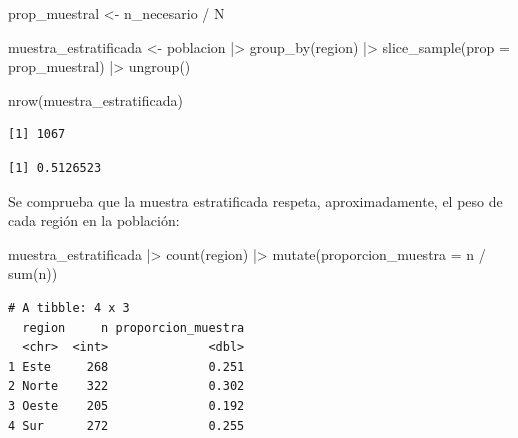 \documentclass[
  spanish,
  a4paper,
]{scrreport}
\newenvironment{Shaded}{\begin{snugshade}}{\end{snugshade}}
\newcommand{\AttributeTok}[1]{\textcolor[rgb]{0.40,0.45,0.13}{#1}}
\newcommand{\FunctionTok}[1]{\textcolor[rgb]{0.28,0.35,0.67}{#1}}
\newcommand{\NormalTok}[1]{\textcolor[rgb]{0.00,0.23,0.31}{#1}}
\newcommand{\OtherTok}[1]{\textcolor[rgb]{0.00,0.23,0.31}{#1}}
\newcommand{\SpecialCharTok}[1]{\textcolor[rgb]{0.37,0.37,0.37}{#1}}
\newcommand{\StringTok}[1]{\textcolor[rgb]{0.13,0.47,0.30}{#1}}
\theoremstyle{definition}
\theoremstyle{definition}
\theoremstyle{remark}
\begin{document}
\begin{Shaded}
\begin{Highlighting}[]
\NormalTok{prop\_muestral }\OtherTok{\textless{}{-}}\NormalTok{ n\_necesario }\SpecialCharTok{/}\NormalTok{ N}

\NormalTok{muestra\_estratificada }\OtherTok{\textless{}{-}}\NormalTok{ poblacion }\SpecialCharTok{|\textgreater{}}
  \FunctionTok{group\_by}\NormalTok{(region) }\SpecialCharTok{|\textgreater{}}
  \FunctionTok{slice\_sample}\NormalTok{(}\AttributeTok{prop =}\NormalTok{ prop\_muestral) }\SpecialCharTok{|\textgreater{}}
  \FunctionTok{ungroup}\NormalTok{()}

\FunctionTok{nrow}\NormalTok{(muestra\_estratificada)}
\end{Highlighting}
\end{Shaded}

\begin{verbatim}
[1] 1067
\end{verbatim}

\begin{Shaded}
\end{Shaded}

\begin{verbatim}
[1] 0.5126523
\end{verbatim}

Se comprueba que la muestra estratificada respeta, aproximadamente, el
peso de cada región en la población:

\begin{Shaded}
\begin{Highlighting}[]
\NormalTok{muestra\_estratificada }\SpecialCharTok{|\textgreater{}}
  \FunctionTok{count}\NormalTok{(region) }\SpecialCharTok{|\textgreater{}}
  \FunctionTok{mutate}\NormalTok{(}\AttributeTok{proporcion\_muestra =}\NormalTok{ n }\SpecialCharTok{/} \FunctionTok{sum}\NormalTok{(n))}
\end{Highlighting}
\end{Shaded}

\begin{verbatim}
# A tibble: 4 x 3
  region     n proporcion_muestra
  <chr>  <int>              <dbl>
1 Este     268              0.251
2 Norte    322              0.302
3 Oeste    205              0.192
4 Sur      272              0.255
\end{verbatim}
\end{document}
